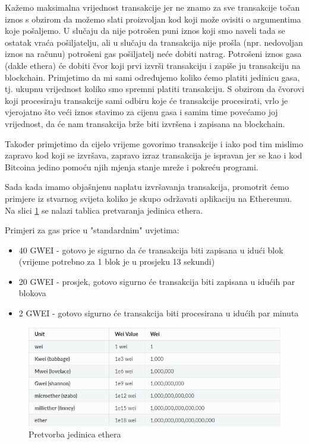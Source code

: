 \documentclass[12pt]{report}
\begin{document}
Kažemo maksimalna vrijednost transakcije jer ne znamo za sve transakcije točan iznos s obzirom da možemo slati proizvoljan kod koji može ovisiti o argumentima koje pošaljemo. U slučaju da nije potrošen puni iznos koji smo naveli tada se ostatak vraća pošiljatelju, ali u slučaju da transakcija nije prošla (npr. nedovoljan iznos na računu) potrošeni gas pošiljatelj neće dobiti natrag. Potrošeni iznos gasa (dakle ethera) će dobiti čvor koji prvi izvrši transakciju i zapiše ju transakciju na blockchain. Primjetimo da mi sami određujemo koliko ćemo platiti jedinicu gasa, tj. ukupnu vrijednost koliko smo spremni platiti transakciju. S obzirom da čvorovi koji procesiraju transakcije sami odbiru koje će transakcije procesirati, vrlo je vjerojatno što veći iznos stavimo za cijenu gasa i samim time povećamo joj vrijednost, da će nam transakcija brže biti izvršena i zapisana na blockchain.

Također primjetimo da cijelo vrijeme govorimo transakcije i iako pod tim mislimo zapravo kod koji se izvršava, zapravo izraz transakcija je ispravan jer se kao i kod Bitcoina jedino pomoću njih mjenja stanje mreže i pokreću programi.

Sada kada imamo objašnjenu naplatu izvršavanja transakcija, promotrit ćemo primjere iz stvarnog svijeta koliko je skupo održavati aplikaciju na Ethereumu. Na slici \ref{fig:ethunits} se nalazi tablica pretvaranja jedinica ethera.

Primjeri za gas price u "standardnim" uvjetima: 
\begin{itemize}
    \item 40 GWEI - gotovo je sigurno da će transakcija biti zapisana u idući blok (vrijeme potrebno za 1 blok je u prosjeku 13 sekundi)
    \item 20 GWEI - prosjek, gotovo sigurno će transakcija biti zapisana u idućih par blokova
    \item 2 GWEI - gotovo sigurno će transakcija biti procesirana u idućih par minuta
\end{itemize}

\begin{figure}[!]
\centering
\includegraphics[scale=0.55]{ether_units}
\caption{Pretvorba jedinica ethera}
\label{fig:ethunits}
\end{figure}
\end{document}
